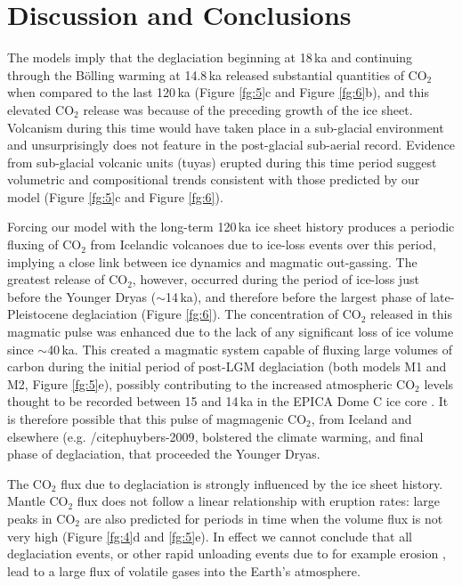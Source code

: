 \documentclass[draft,linenumbers]{agujournal2018}
\begin{document}
\section{Discussion and Conclusions}

The models imply that the deglaciation beginning at 18\,ka and continuing through the B{\"o}lling warming at 14.8\,ka released substantial quantities of CO$_{2}$ when compared to the last 120\,ka (Figure \ref{fg:5}c and Figure \ref{fg:6}b), and this elevated CO$_{2}$ release was because of the preceding growth of the ice sheet. Volcanism during this time would have taken place in a sub-glacial environment and unsurprisingly does not feature in the post-glacial sub-aerial record. Evidence from sub-glacial volcanic units (tuyas) erupted during this time period \citep{hartley-etal-2016} suggest volumetric and compositional trends consistent with those predicted by our model (Figure \ref{fg:5}c and Figure \ref{fg:6}).

Forcing our model with the long-term 120\,ka ice sheet history produces a periodic fluxing of CO$_{2}$ from Icelandic volcanoes due to ice-loss events over this period, implying a close link between ice dynamics and magmatic out-gassing. The greatest release of CO$_{2}$, however, occurred during the period of ice-loss just before the Younger Dryas ($\sim$14\,ka), and therefore before the largest phase of late-Pleistocene deglaciation (Figure \ref{fg:6}). The concentration of CO$_{2}$ released in this magmatic pulse was enhanced due to the lack of any significant loss of ice volume since $\sim$40\,ka. This created a magmatic system capable of fluxing large volumes of carbon during the initial period of post-LGM deglaciation (both models M1 and M2, Figure \ref{fg:5}e), possibly contributing to the increased atmospheric CO$_{2}$ levels thought to be recorded between 15 and 14\,ka in the EPICA Dome C ice core \citep{kohler-etal-2011}. It is therefore possible that this pulse of magmagenic CO$_{2}$, from Iceland and elsewhere (e.g. /citep{huybers-2009},  bolstered the climate warming, and final phase of deglaciation, that proceeded the Younger Dryas.

The CO$_{2}$ flux due to deglaciation is strongly influenced by the ice sheet history. Mantle CO$_{2}$ flux does not follow a linear relationship with eruption rates: large peaks in CO$_{2}$ are also predicted for periods in time when the volume flux is not very high (Figure \ref{fg:4}d and \ref{fg:5}e). In effect we cannot conclude that all deglaciation events, or other rapid unloading events due to for example erosion \citep[e.g.][]{sternai-etal-2016}, lead to a large flux of volatile gases into the Earth’s atmosphere.
\end{document}
